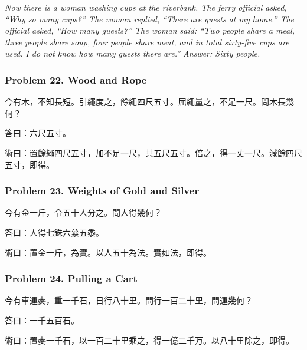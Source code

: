 \documentclass[11pt,a4paper]{article}
\newcommand{\zh}[1]{{\CJKfamily{}#1}}
\begin{document}
\textit{Now there is a woman washing cups at the riverbank. The ferry official asked, ``Why so many cups?'' The woman replied, ``There are guests at my home.'' The official asked, ``How many guests?'' The woman said: ``Two people share a meal, three people share soup, four people share meat, and in total sixty-five cups are used. I do not know how many guests there are.'' Answer: Sixty people.}

\subsubsection*{Problem 22. Wood and Rope}

\begin{problembox}[title=\zh{問}]
\zh{今有木，不知長短。引繩度之，餘繩四尺五寸。屈繩量之，不足一尺。問木長幾何？}
\end{problembox}
\begin{answerbox}[title=\zh{答}]
\zh{答曰：六尺五寸。}
\end{answerbox}
\begin{methodbox}[title=\zh{術}]
\zh{術曰：置餘繩四尺五寸，加不足一尺，共五尺五寸。倍之，得一丈一尺。減餘四尺五寸，即得。}
\end{methodbox}

\subsubsection*{Problem 23. Weights of Gold and Silver}

\begin{problembox}[title=\zh{問}]
\zh{今有金一斤，令五十人分之。問人得幾何？}
\end{problembox}
\begin{answerbox}[title=\zh{答}]
\zh{答曰：人得七銖六絫五黍。}
\end{answerbox}
\begin{methodbox}[title=\zh{術}]
\zh{術曰：置金一斤，為實。以人五十為法。實如法，即得。}
\end{methodbox}

\subsubsection*{Problem 24. Pulling a Cart}

\begin{problembox}[title=\zh{問}]
\zh{今有車運麥，重一千石，日行八十里。問行一百二十里，問運幾何？}
\end{problembox}
\begin{answerbox}[title=\zh{答}]
\zh{答曰：一千五百石。}
\end{answerbox}
\begin{methodbox}[title=\zh{術}]
\zh{術曰：置麥一千石，以一百二十里乘之，得一億二千万。以八十里除之，即得。}
\end{methodbox}
\end{document}

